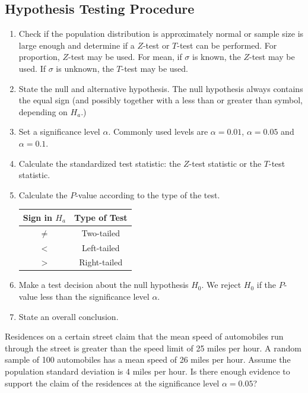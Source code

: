 \hypertarget{hypothesis-testing-procedure}{%
\subsection{Hypothesis Testing
Procedure}\label{hypothesis-testing-procedure}}

\begin{enumerate}[sepno]
\item
  Check if the population distribution is approximately normal or sample size is large enough and determine if a \(Z\)-test
  or \(T\)-test can be performed. For proportion, \(Z\)-test may be
  used. For mean, if \(\sigma\) is known, the \(Z\)-test may be used. If
  \(\sigma\) is unknown, the \(T\)-test may be used.
\item
  State the null and alternative hypothesis. The null hypothesis always
  contains the equal sign (and possibly together with a less than or
  greater than symbol, depending on \(H_a\).)
\item
  Set a significance level \(\alpha\). Commonly used levels are
  \(\alpha=0.01\), \(\alpha=0.05\) and \(\alpha=0.1\).
\item
  Calculate the standardized test statistic: the \(Z\)-test statistic or
  the \(T\)-test statistic.
\item
  Calculate the \(P\)-value according to the type of the test.

  \begin{tabular}{cc}
    \toprule
    Sign in \(H_a\) & Type of Test\\
    \midrule
    \(\ne\) & Two-tailed\\
    \(<\) &  Left-tailed\\
    \(>\) & Right-tailed\\
    \bottomrule
  \end{tabular}
  
\item
  Make a test decision about the null hypothesis \(H_0\). We reject
  \(H_0\) if the \(P\)-value less than the significance level
  \(\alpha\).
\item
  State an overall conclusion.
\end{enumerate}
\vspace*{-0.5\baselineskip}

\begin{example}

Residences on a certain street claim that the mean speed of automobiles
run through the street is greater than the speed limit of 25 miles per
hour. A random sample of 100 automobiles has a mean speed of 26 miles
per hour. Assume the population standard deviation is 4 miles per hour.
Is there enough evidence to support the claim of the residences at the
significance level \(\alpha = 0.05\)?

\end{example}
\vspace*{8\baselineskip}

